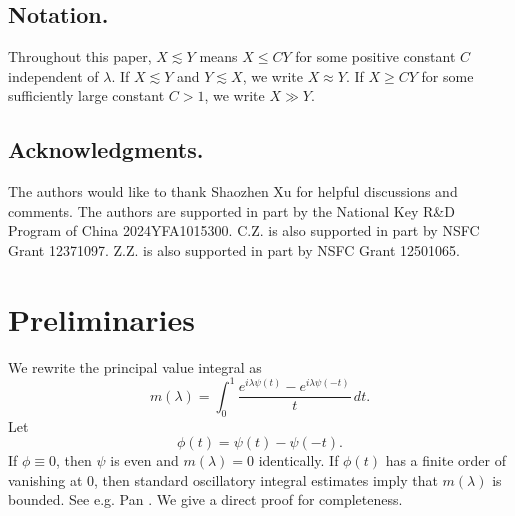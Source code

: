 \documentclass[11pt]{amsart}
\newcommand{\la}{\lambda}
\newcommand{\ls}{\lesssim}
\newcommand{\1}{{\rm 1\hspace*{-0.4ex}%
			\rule{0.1ex}{1.52ex}\hspace*{0.2ex}}}
\numberwithin{equation}{section}
\begin{document}
\subsection{Notation.} Throughout this paper, $X\ls Y$ means $X\le CY$ for some positive constant $C$ independent of $\la$. If $X\ls Y$ and $Y\ls X$, we write $X\approx Y$.  If $X\ge CY$ for some sufficiently large constant $C>1$, we write $X\gg Y$. 

\subsection{Acknowledgments.}
The authors would like to thank Shaozhen Xu for helpful discussions and comments. The authors are supported in part by the National Key R\&D Program of China 2024YFA1015300. C.Z. is also supported in part by NSFC Grant 12371097. Z.Z. is also supported in part by NSFC Grant 12501065.
 
\section{Preliminaries}\label{sec2}
We rewrite the principal value integral as
\begin{equation}\label{eq:pv}
	m(\lambda)
	=
	\int_0^1 \frac{e^{i\lambda\psi(t)}-e^{i\lambda\psi(-t)}}{t}\,dt.
\end{equation}
Let
\begin{equation}\label{phidef}
	\phi(t)=\psi(t)-\psi(-t).
\end{equation}
	If $\phi\equiv 0$, then $\psi$ is even and $m(\lambda)=0$ identically. If $\phi(t)$ has a finite order of vanishing at $0$, then standard
oscillatory integral estimates imply that $m(\lambda)$ is bounded. See e.g. Pan \cite[Lemma 2.3]{pan93}. We give a direct proof for completeness.
\end{document}
